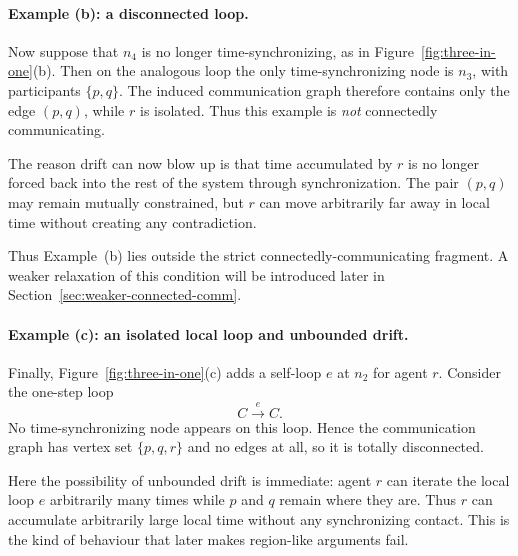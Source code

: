 \begin{example}
\paragraph{Example (b): a disconnected loop.}
Now suppose that \(n_4\) is no longer time-synchronizing, as in
Figure~\ref{fig:three-in-one}(b). Then on the analogous loop the only
time-synchronizing node is \(n_3\), with participants \(\{p,q\}\). The induced
communication graph therefore contains only the edge \((p,q)\), while \(r\) is
isolated. Thus this example is \emph{not} connectedly communicating.

The reason drift can now blow up is that time accumulated by \(r\) is no longer
forced back into the rest of the system through synchronization. The pair
\((p,q)\) may remain mutually constrained, but \(r\) can move arbitrarily far
away in local time without creating any contradiction.

Thus Example~(b) lies outside the strict connectedly-communicating fragment. A
weaker relaxation of this condition will be introduced later in
Section~\ref{sec:weaker-connected-comm}.


\paragraph{Example (c): an isolated local loop and unbounded drift.}
Finally, Figure~\ref{fig:three-in-one}(c) adds a self-loop \(e\) at \(n_2\) for
agent \(r\). Consider the one-step loop
\[
C \xrightarrow{e} C.
\]
No time-synchronizing node appears on this loop. Hence the communication graph
has vertex set \(\{p,q,r\}\) and no edges at all, so it is totally disconnected.

Here the possibility of unbounded drift is immediate: agent \(r\) can iterate the
local loop \(e\) arbitrarily many times while \(p\) and \(q\) remain where they
are. Thus \(r\) can accumulate arbitrarily large local time without any
synchronizing contact. This is the kind of behaviour that later makes region-like
arguments fail.\\


\end{example}
